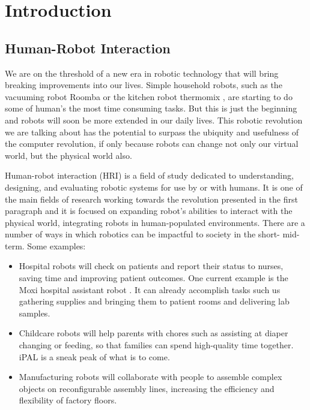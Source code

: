 \chapter{Introduction}
\label{introchap}

\section{Human-Robot Interaction}
We are on the threshold of a new era in robotic technology that will bring breaking improvements into our lives. Simple household robots, such as the vacuuming robot Roomba\textsuperscript{\textregistered} \cite{roomba} or the kitchen robot thermomix\textsuperscript{\textregistered} \cite{thermomix}, are starting to do some of human's the most time consuming tasks. But this is just the beginning and robots will soon be more extended in our daily lives. This robotic revolution we are talking about has the potential to surpass the ubiquity and usefulness of the computer revolution, if only because robots can change not only our virtual world, but the physical world also.

Human-robot interaction (HRI) is a field of study dedicated to understanding, designing, and evaluating robotic systems for use by or with humans. It is one of the main fields of research working towards the revolution presented in the first paragraph and it is focused on expanding robot's abilities to interact with the physical world, integrating robots in human-populated environments. There are a number of ways in which robotics can be impactful to society in the short- mid- term. Some examples:

\begin{itemize}
    \item Hospital robots will check on patients and report their status to nurses, saving time and improving patient outcomes. One current example is the Moxi\textsuperscript{\textregistered} hospital assistant robot \cite{moxi}. It can already accomplish tasks such us gathering supplies and bringing them to patient rooms and delivering lab samples.
    \item Childcare robots will help parents with chores such as assisting at diaper changing or feeding, so that families can spend high-quality time together. iPAL\textsuperscript{\textregistered} \cite{ipal} is a sneak peak of what is to come.
    \item Manufacturing robots will collaborate with people to assemble complex objects on reconfigurable assembly lines, increasing the efficiency and flexibility of factory floors.
\end{itemize}

